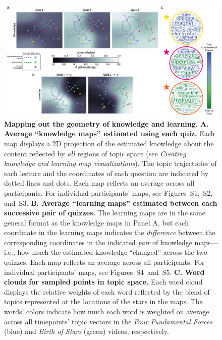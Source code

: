 \documentclass[10pt]{article}
\newcommand{\individualKnowledgeMapsA}{S1}
\newcommand{\individualKnowledgeMapsB}{S2}
\newcommand{\individualKnowledgeMapsC}{S3}
\newcommand{\individualLearningMapsA}{S4}
\newcommand{\individualLearningMapsB}{S5}
\begin{document}
\begin{figure}[tp]
    \centering
    \includegraphics[width=\textwidth]{figs/knowledge_and_learning_maps}

    \caption{\textbf{Mapping out the geometry of knowledge and learning.}
    \textbf{A. Average ``knowledge maps'' estimated using each quiz.} Each map
    displays a 2D projection of the estimated knowledge about the content
    reflected by \textit{all} regions of topic space (see \textit{Creating
    knowledge and learning map visualizations}). The topic trajectories of each
    lecture and the coordinates of each question are indicated by dotted lines
    and dots. Each map reflects an average across all participants. For
    individual participants' maps, see
    Figures~\individualKnowledgeMapsA,~\individualKnowledgeMapsB,
    and~\individualKnowledgeMapsC. \textbf{B. Average ``learning maps''
    estimated between each successive pair of quizzes.} The learning maps are
    in the same general format as the knowledge maps in Panel A, but each
    coordinate in the learning maps indicates the \textit{difference} between
    the corresponding coordinates in the indicated \textit{pair} of knowledge
    maps---i.e., how much the estimated knowledge ``changed'' across the two
    quizzes. Each map reflects an average across all participants. For
    individual participants' maps, see
    Figures~\individualLearningMapsA~and~\individualLearningMapsB. \textbf{C.
    Word clouds for sampled points in topic space.} Each word cloud displays
    the relative weights of each word reflected by the blend of topics
    represented at the locations of the stars in the maps. The words' colors
    indicate how much each word is weighted on average across all timepoints'
    topic vectors in the \textit{Four Fundamental Forces} (blue) and
    \textit{Birth of Stars} (green) videos, respectively.}

    \label{fig:knowledge-maps}
    \end{figure}
\end{document}
